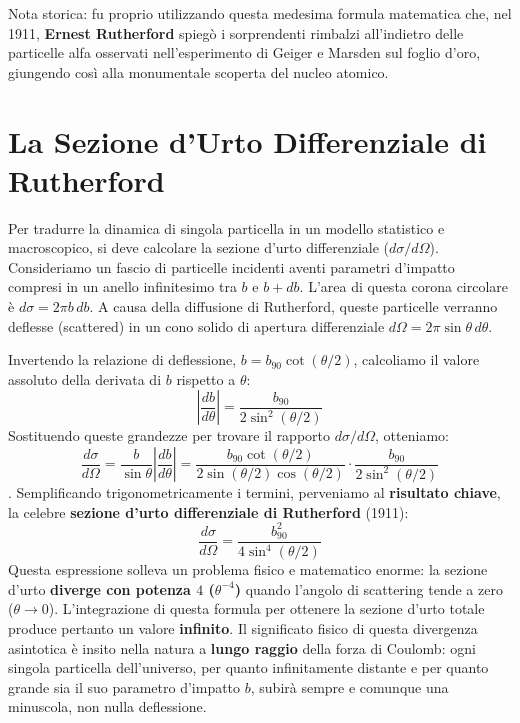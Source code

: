 Nota storica: fu proprio utilizzando questa medesima formula matematica che, nel 1911, \textbf{Ernest Rutherford} spiegò i sorprendenti rimbalzi all'indietro delle particelle alfa osservati nell'esperimento di Geiger e Marsden sul foglio d'oro, giungendo così alla monumentale scoperta del nucleo atomico.

\section{La Sezione d'Urto Differenziale di Rutherford}

Per tradurre la dinamica di singola particella in un modello statistico e macroscopico, si deve calcolare la sezione d'urto differenziale ($d\sigma/d\Omega$). Consideriamo un fascio di particelle incidenti aventi parametri d'impatto compresi in un anello infinitesimo tra $b$ e $b + db$. L'area di questa corona circolare è $d\sigma = 2\pi b \, db$. A causa della diffusione di Rutherford, queste particelle verranno deflesse (scattered) in un cono solido di apertura differenziale $d\Omega = 2\pi \sin\theta \, d\theta$.

Invertendo la relazione di deflessione, $b = b_{90} \cot(\theta/2)$, calcoliamo il valore assoluto della derivata di $b$ rispetto a $\theta$:
\begin{equation}
\left| \frac{db}{d\theta} \right| = \frac{b_{90}}{2 \sin^2(\theta/2)}
\end{equation}
Sostituendo queste grandezze per trovare il rapporto $d\sigma/d\Omega$, otteniamo:
\begin{equation}
\frac{d\sigma}{d\Omega} = \frac{b}{\sin\theta} \left| \frac{db}{d\theta} \right| = \frac{b_{90} \cot(\theta/2)}{2 \sin(\theta/2) \cos(\theta/2)} \cdot \frac{b_{90}}{2 \sin^2(\theta/2)}
\end{equation}
.
Semplificando trigonometricamente i termini, perveniamo al \textbf{risultato chiave}, la celebre \textbf{sezione d'urto differenziale di Rutherford} (1911):
\begin{equation}
\frac{d\sigma}{d\Omega} = \frac{b_{90}^2}{4 \sin^4(\theta/2)}
\end{equation}
Questa espressione solleva un problema fisico e matematico enorme: la sezione d'urto \textbf{diverge con potenza $4$ ($\theta^{-4}$)} quando l'angolo di scattering tende a zero ($\theta \to 0$). L'integrazione di questa formula per ottenere la sezione d'urto totale produce pertanto un valore \textbf{infinito}.
Il significato fisico di questa divergenza asintotica è insito nella natura a \textbf{lungo raggio} della forza di Coulomb: ogni singola particella dell'universo, per quanto infinitamente distante e per quanto grande sia il suo parametro d'impatto $b$, subirà sempre e comunque una minuscola, non nulla deflessione.

